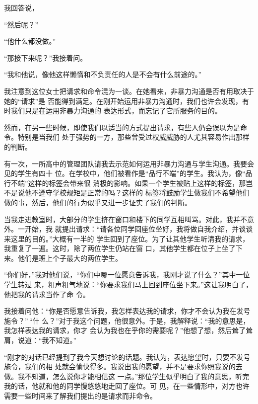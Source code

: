 \documentclass{ctexart}
\renewenvironment{quotation}{\setlength{\parskip}{0.5em}\setstretch{1.5}\kaishu\zihao{-5}\setlength{\parindent}{1em}}{\vspace{1em}}
\begin{document}
我回答说，

\begin{quotation}
	``然后呢？''

	``他什么都没做。''
\end{quotation}

``那接下来呢？''我接着问。

\begin{quotation}
	``我和他说，像他这样懒惰和不负责任的人是不会有什么前途的。''
\end{quotation}

我注意到这位女士把请求和命令混为一谈。在她看来，非暴力沟通是否有用取决于她的``请求''是
否能得到满足。在刚开始运用非暴力沟通时，我们也许会发现，有时我们只是在运用非暴力沟通的
表达形式，而忘记了它所服务的目的。

然而，在另一些时候，即使我们以适当的方式提出请求，有些人仍会误以为是命令。特别是当我们
处于强势的一方，那些曾受过权威威胁的人尤其容易作出那样的判断。

有一次，一所高中的管理团队请我去示范如何运用非暴力沟通与学生沟通。我要会见的学生有四十
位。在学校中，他们被看作是``品行不端''的学生。我认为，像``品行不端''这样的标签会带来很
消极的影响。如果一个学生被贴上这样的标签，那岂不是说他不遵守学校规矩是正常的吗？这样的
标签将鼓励学生做我们不希望他们做的事，然后，他们的行为似乎又进一步证实了我们的判断。

当我走进教室时，大部分的学生挤在窗口和楼下的同学互相叫骂。对此，我并不意外。一开始，我
就提出请求：``请各位同学回座位坐好，我将做自我介绍，并谈谈来这里的目的。''大概有一半的
学生回到了座位。为了让其他学生听清我的请求，我重复了一遍。这时，除了两位学生仍站在窗
口，其他学生都在位子上坐了下来。他们是班上个子最大的两位学生。

``你们好，''我对他们说，``你们中哪一位愿意告诉我，我刚才说了什么？''其中一位学生转过
来，粗声粗气地说：``你要求我们马上回到座位坐下来。''这让我明白了，他把我的请求当作了命
令。

我接着问他：``你是否愿意告诉我，我怎样表达我的请求，你才不会认为我在发号施令？''\,``什
么？''对于我这个问题，他很意外。于是，我解释说：``我的意思是，我怎样表达我的请求，你才
会认为我也在乎你的需要呢？''他想了想，然后耸了耸肩，说道：``我不知道。''

``刚才的对话已经提到了我今天想讨论的话题。我认为，表达愿望时，只要不发号施令，我们的相
处就会愉快得多。我说出我的愿望，并不是要求你照我说的去做。我不知道，怎么说你才能相信这
一点。''那位学生似乎明白了我的意思，听完我的话，他就和他的同学慢悠悠地走回了座位。可
见，在一些情形中，对方也许需要一些时间来了解我们提出的是请求而非命令。
\end{document}
